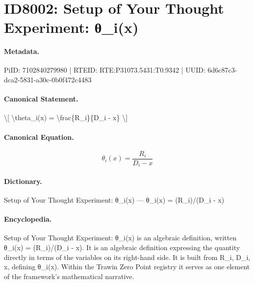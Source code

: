 \section*{ID8002: Setup of Your Thought Experiment: θ\_i(x)}
\paragraph{Metadata.}
PiID: 7102840279980 | RTEID: RTE:P31073.5431:T0.9342 | UUID: 6d6c87c3-dca2-5831-a30c-0b0f472c4483

\paragraph{Canonical Statement.}
\textbackslash{}[ \textbackslash{}theta\_i(x) = \textbackslash{}frac\{R\_i\}\{D\_i - x\} \textbackslash{}]

\paragraph{Canonical Equation.}
\[
\theta_i(x) = \frac{R_i}{D_i - x}
\]

\paragraph{Dictionary.}
Setup of Your Thought Experiment: θ\_i(x) — θ\_i(x) = (R\_i)/(D\_i - x)

\paragraph{Encyclopedia.}
Setup of Your Thought Experiment: θ\_i(x) is an algebraic definition, written θ\_i(x) = (R\_i)/(D\_i - x). It is an algebraic definition expressing the quantity directly in terms of the variables on its right-hand side. It is built from R\_i, D\_i, x, defining θ\_i(x). Within the Trawin Zero Point registry it serves as one element of the framework's mathematical narrative.
